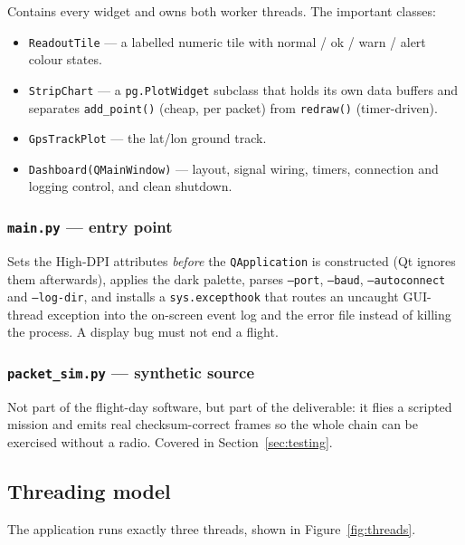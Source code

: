 \documentclass[11pt,a4paper]{article}
\newcommand{\file}[1]{\texttt{#1}}
\newcommand{\code}[1]{\texttt{#1}}
\begin{document}
Contains every widget and owns both worker threads. The important classes:

\begin{itemize}
  \item \code{ReadoutTile} --- a labelled numeric tile with normal / ok /
        warn / alert colour states.
  \item \code{StripChart} --- a \code{pg.PlotWidget} subclass that holds its
        own data buffers and separates \code{add\_point()} (cheap, per packet)
        from \code{redraw()} (timer-driven).
  \item \code{GpsTrackPlot} --- the lat/lon ground track.
  \item \code{Dashboard(QMainWindow)} --- layout, signal wiring, timers,
        connection and logging control, and clean shutdown.
\end{itemize}

\subsubsection{\file{main.py} --- entry point}

Sets the High-DPI attributes \emph{before} the \code{QApplication} is
constructed (Qt ignores them afterwards), applies the dark palette, parses
\code{--port}, \code{--baud}, \code{--autoconnect} and \code{--log-dir}, and
installs a \code{sys.excepthook} that routes an uncaught GUI-thread exception
into the on-screen event log and the error file instead of killing the
process. A display bug must not end a flight.

\subsubsection{\file{packet\_sim.py} --- synthetic source}

Not part of the flight-day software, but part of the deliverable: it flies a
scripted mission and emits real checksum-correct frames so the whole chain can
be exercised without a radio. Covered in Section~\ref{sec:testing}.

\subsection{Threading model}
\label{sec:threading}

The application runs exactly three threads, shown in
Figure~\ref{fig:threads}.
\end{document}
